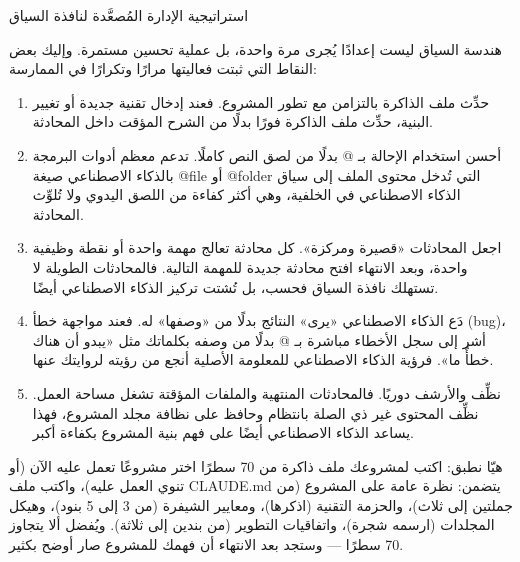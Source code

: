\begin{center}\small\color{gray}استراتيجية الإدارة المُصعَّدة لنافذة السياق\end{center}


هندسة السياق ليست إعدادًا يُجرى مرة واحدة، بل عملية تحسين مستمرة. وإليك بعض النقاط التي ثبتت فعاليتها مرارًا وتكرارًا في الممارسة:

\begin{enumerate}
  \item حدِّث ملف الذاكرة بالتزامن مع تطور المشروع. فعند إدخال تقنية جديدة أو تغيير البنية، حدِّث ملف الذاكرة فورًا بدلًا من الشرح المؤقت داخل المحادثة.
  \item أحسن استخدام الإحالة بـ @ بدلًا من لصق النص كاملًا. تدعم معظم أدوات البرمجة بالذكاء الاصطناعي صيغة @file أو @folder التي تُدخل محتوى الملف إلى سياق الذكاء الاصطناعي في الخلفية، وهي أكثر كفاءة من اللصق اليدوي ولا تُلوِّث المحادثة.
  \item اجعل المحادثات «قصيرة ومركزة». كل محادثة تعالج مهمة واحدة أو نقطة وظيفية واحدة، وبعد الانتهاء افتح محادثة جديدة للمهمة التالية. فالمحادثات الطويلة لا تستهلك نافذة السياق فحسب، بل تُشتت تركيز الذكاء الاصطناعي أيضًا.
  \item دَع الذكاء الاصطناعي «يرى» النتائج بدلًا من «وصفها» له. فعند مواجهة خطأ (bug)، أشر إلى سجل الأخطاء مباشرة بـ @ بدلًا من وصفه بكلماتك مثل «يبدو أن هناك خطأً ما». فرؤية الذكاء الاصطناعي للمعلومة الأصلية أنجع من رؤيته لروايتك عنها.
  \item نظِّف والأرشف دوريًا. فالمحادثات المنتهية والملفات المؤقتة تشغل مساحة العمل. نظِّف المحتوى غير ذي الصلة بانتظام وحافظ على نظافة مجلد المشروع، فهذا يساعد الذكاء الاصطناعي أيضًا على فهم بنية المشروع بكفاءة أكبر.
\end{enumerate}

\begin{tcbpractice}{هيّا نطبق: اكتب لمشروعك ملف ذاكرة من 70 سطرًا}
اختر مشروعًا تعمل عليه الآن (أو تنوي العمل عليه)، واكتب ملف CLAUDE.md يتضمن: نظرة عامة على المشروع (من جملتين إلى ثلاث)، والحزمة التقنية (اذكرها)، ومعايير الشيفرة (من 3 إلى 5 بنود)، وهيكل المجلدات (ارسمه شجرة)، واتفاقيات التطوير (من بندين إلى ثلاثة). ويُفضل ألا يتجاوز 70 سطرًا — وستجد بعد الانتهاء أن فهمك للمشروع صار أوضح بكثير.

\end{tcbpractice}

